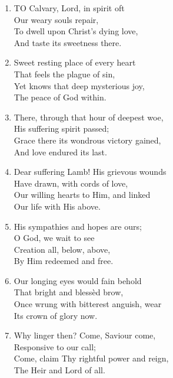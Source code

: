 \documentclass[11pt,a4paper]{article}
\begin{document}
\begin{enumerate}
    \item TO Calvary, Lord, in spirit oft \\
            Our weary souls repair, \\
        To dwell upon Christ's dying love, \\
            And taste its sweetness there.

    \item Sweet resting place of every heart \\
            That feels the plague of sin, \\
        Yet knows that deep mysterious joy, \\
            The peace of God within.

    \item There, through that hour of deepest woe, \\
            His suffering spirit passed; \\
        Grace there its wondrous victory gained, \\
            And love endured its last.

    \item Dear suffering Lamb! His grievous wounds \\
            Have drawn, with cords of love, \\
        Our willing hearts to Him, and linked \\
            Our life with His above.

    \item His sympathies and hopes are ours; \\
            O God, we wait to see \\
        Creation all, below, above, \\
            By Him redeemed and free.

    \item Our longing eyes would fain behold \\
            That bright and bless\`ed brow, \\
        Once wrung with bitterest anguish, wear \\
            Its crown of glory now.

    \item Why linger then? Come, Saviour come, \\
            Responsive to our call; \\
        Come, claim Thy rightful power and reign, \\
            The Heir and Lord of all.

\end{enumerate}
\end{document}
